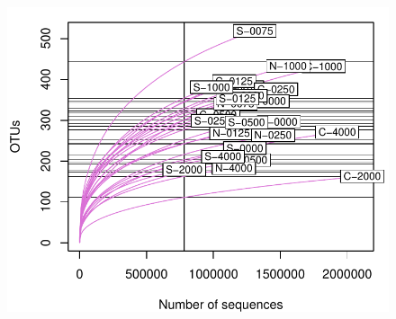 \documentclass[11pt,letterpaper]{article} %
\begin{document}
\begin{figure}[H] %
  \centering
    \includegraphics[height=0.6\textheight]{rarefaction.pdf}
    \caption{\protect}
  \label{rarefaction}
\end{figure}
\end{document}
